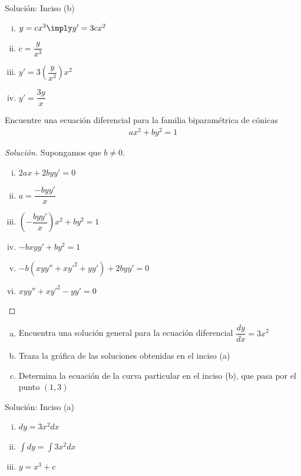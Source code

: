 {Solución: Inciso (b)}
  \begin{enumerate}[(i)]
    \item  $y=cx^3 \imply y'=3cx^{2}$ 
    \item $c=\dfrac{y}{x^3}$ 
    \item $y'=3\left( \dfrac{y}{x^3} \right)x^2$ 
    \item $y'=\dfrac{3y}{x}$
\end{enumerate}

{}
  \begin{solved}

  Encuentre una ecuación diferencial para la familia biparamétrica de cónicas 
         \begin{align}
     ax^{2}+by^{2}=1
     \end{align}

  \end{solved}


{}
      \begin{proof}[Solución]
      
      Supongamos que $b\neq 0$. 
    \begin{enumerate}[(i)] 
      \item $2ax+2byy'=0$ 
      \item $a = \dfrac{-byy'}{x}$ 
      \item $\left( -\dfrac{byy'}{x} \right)x^{2}+by^{2}=1$ 
      \item $-bxyy'+by^{2}=1$ 
      \item $-b\left( xyy''+xy'^{2}+yy' \right)
      +2byy'=0$ 
      \item $xyy''+xy'^{2}-yy'=0$
\end{enumerate}
    \end{proof}

{}
  \begin{enumerate}[(a)]
    \item  Encuentra una solución general para la ecuación diferencial $\dfrac{dy}{dx}=3x^{2}$
    \item Traza la gráfica de las soluciones obtenidas en el inciso (a)
    \item Determina la ecuación de la curva particular en el inciso (b), que pasa por el punto $\left( 1,3 \right)$
\end{enumerate}

{Solución: Inciso (a)}
 \begin{enumerate}[(i)]
   \item $dy=3x^{2}dx$ 
   \item $\displaystyle 
   \int dy = \int 3x^{2}dx$
   
   \item $y=x^{3}+c$
\end{enumerate}

